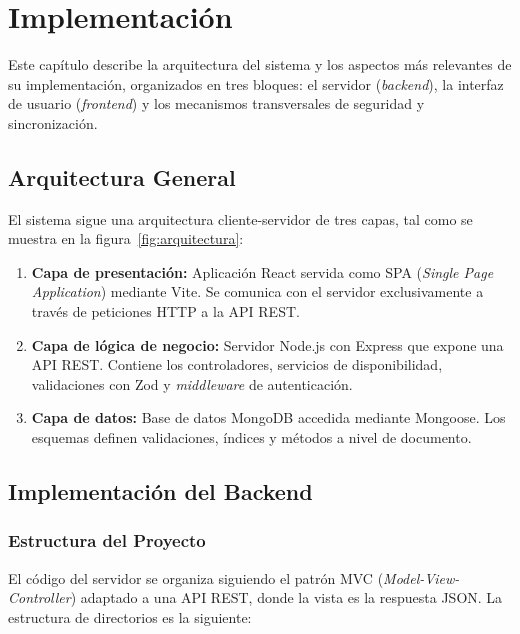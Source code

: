 
\chapter{Implementaci\'on}\label{cap:implementacion}

Este cap\'itulo describe la arquitectura del sistema y los aspectos m\'as relevantes de su implementaci\'on, organizados en tres bloques: el servidor (\textit{backend}), la interfaz de usuario (\textit{frontend}) y los mecanismos transversales de seguridad y sincronizaci\'on.

\section{Arquitectura General}\label{sec:arquitectura}

El sistema sigue una arquitectura cliente-servidor de tres capas, tal como se muestra en la figura~\ref{fig:arquitectura}:


\begin{enumerate}
    \item \textbf{Capa de presentaci\'on:} Aplicaci\'on React servida como SPA (\textit{Single Page Application}) mediante Vite. Se comunica con el servidor exclusivamente a trav\'es de peticiones HTTP a la API REST.
    \item \textbf{Capa de l\'ogica de negocio:} Servidor Node.js con Express que expone una API REST. Contiene los controladores, servicios de disponibilidad, validaciones con Zod y \textit{middleware} de autenticaci\'on.
    \item \textbf{Capa de datos:} Base de datos MongoDB accedida mediante Mongoose. Los esquemas definen validaciones, \'indices y m\'etodos a nivel de documento.
\end{enumerate}

\section{Implementaci\'on del Backend}\label{sec:backend}

\subsection{Estructura del Proyecto}\label{subsec:estructura-backend}

El c\'odigo del servidor se organiza siguiendo el patr\'on MVC (\textit{Model-View-Controller}) adaptado a una API REST, donde la vista es la respuesta JSON. La estructura de directorios es la siguiente:

